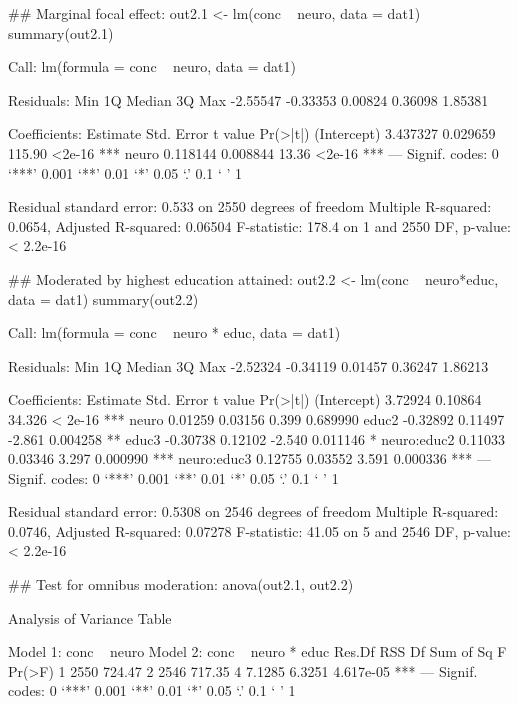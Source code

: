 \begin{Schunk}
\begin{Sinput}
 ## Marginal focal effect:
 out2.1 <- lm(conc ~ neuro, data = dat1)
 summary(out2.1)
\end{Sinput}
\begin{Soutput}
Call:
lm(formula = conc ~ neuro, data = dat1)

Residuals:
     Min       1Q   Median       3Q      Max 
-2.55547 -0.33353  0.00824  0.36098  1.85381 

Coefficients:
            Estimate Std. Error t value Pr(>|t|)    
(Intercept) 3.437327   0.029659  115.90   <2e-16 ***
neuro       0.118144   0.008844   13.36   <2e-16 ***
---
Signif. codes:  0 ‘***’ 0.001 ‘**’ 0.01 ‘*’ 0.05 ‘.’ 0.1 ‘ ’ 1

Residual standard error: 0.533 on 2550 degrees of freedom
Multiple R-squared:  0.0654,	Adjusted R-squared:  0.06504 
F-statistic: 178.4 on 1 and 2550 DF,  p-value: < 2.2e-16
\end{Soutput}
\begin{Sinput}
 ## Moderated by highest education attained:
 out2.2 <- lm(conc ~ neuro*educ, data = dat1)
 summary(out2.2)
\end{Sinput}
\begin{Soutput}
Call:
lm(formula = conc ~ neuro * educ, data = dat1)

Residuals:
     Min       1Q   Median       3Q      Max 
-2.52324 -0.34119  0.01457  0.36247  1.86213 

Coefficients:
            Estimate Std. Error t value Pr(>|t|)    
(Intercept)  3.72924    0.10864  34.326  < 2e-16 ***
neuro        0.01259    0.03156   0.399 0.689990    
educ2       -0.32892    0.11497  -2.861 0.004258 ** 
educ3       -0.30738    0.12102  -2.540 0.011146 *  
neuro:educ2  0.11033    0.03346   3.297 0.000990 ***
neuro:educ3  0.12755    0.03552   3.591 0.000336 ***
---
Signif. codes:  0 ‘***’ 0.001 ‘**’ 0.01 ‘*’ 0.05 ‘.’ 0.1 ‘ ’ 1

Residual standard error: 0.5308 on 2546 degrees of freedom
Multiple R-squared:  0.0746,	Adjusted R-squared:  0.07278 
F-statistic: 41.05 on 5 and 2546 DF,  p-value: < 2.2e-16
\end{Soutput}
\begin{Sinput}
 ## Test for omnibus moderation:
 anova(out2.1, out2.2)
\end{Sinput}
\begin{Soutput}
Analysis of Variance Table

Model 1: conc ~ neuro
Model 2: conc ~ neuro * educ
  Res.Df    RSS Df Sum of Sq      F    Pr(>F)    
1   2550 724.47                                  
2   2546 717.35  4    7.1285 6.3251 4.617e-05 ***
---
Signif. codes:  0 ‘***’ 0.001 ‘**’ 0.01 ‘*’ 0.05 ‘.’ 0.1 ‘ ’ 1
\end{Soutput}
\end{Schunk}
